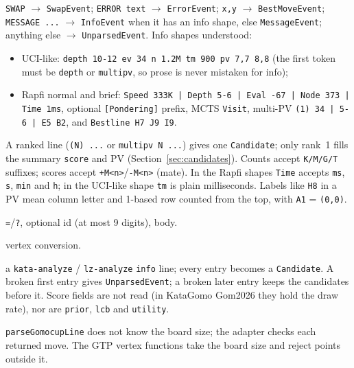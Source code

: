 \documentclass[11pt,a4paper]{article}
\newcommand{\code}[1]{\texttt{#1}}
\begin{document}
\begin{description}[style=nextline]
  \item[\code{parseGomocupLine(line)}] \code{SWAP} $\to$ \code{SwapEvent};
    \code{ERROR text} $\to$ \code{ErrorEvent}; \code{x,y} $\to$ \code{BestMoveEvent};
    \code{MESSAGE ...} $\to$ \code{InfoEvent} when it has an info shape, else \code{MessageEvent};
    anything else $\to$ \code{UnparsedEvent}. Info shapes understood:
    \begin{itemize}
      \item UCI-like: \code{depth 10-12 ev 34 n 1.2M tm 900 pv 7,7 8,8} (the first token must be
            \code{depth} or \code{multipv}, so prose is never mistaken for info);
      \item Rapfi normal and brief: \code{Speed 333K | Depth 5-6 | Eval -67 | Node 373 | Time 1ms},
            optional \code{[Pondering]} prefix, MCTS \code{Visit}, multi-PV \code{(1) 34 | 5-6 | E5 B2},
            and \code{Bestline H7 J9 I9}.
    \end{itemize}
    A ranked line (\code{(N) ...} or \code{multipv N ...}) gives one \code{Candidate}; only
    rank~1 fills the summary \code{score} and PV (Section~\ref{sec:candidates}).
    Counts accept \code{K/M/G/T} suffixes; scores accept \code{+M<n>}/\code{-M<n>} (mate). In
    the Rapfi shapes \code{Time} accepts \code{ms}, \code{s}, \code{min} and \code{h}; in the
    UCI-like shape \code{tm} is plain milliseconds. Labels like \code{H8} in a PV mean column
    letter and 1-based row counted from the top, with \code{A1} = \code{(0,0)}.
  \item[\code{parseGtpResponseHeader(line)}] \code{=}/\code{?}, optional id (at most 9 digits), body.
  \item[\code{parseGtpVertex(text, w, h)} / \code{formatGtpVertex(coord, w, h)}] vertex conversion.
  \item[\code{parseGtpAnalyzeLine(line, w, h)}] a \code{kata-analyze} / \code{lz-analyze}
    \code{info} line; every entry becomes a \code{Candidate}. A broken first entry gives
    \code{UnparsedEvent}; a broken later entry keeps the candidates before it. Score fields are
    not read (in KataGomo Gom2026 they hold the draw rate), nor are \code{prior}, \code{lcb} and
    \code{utility}.
\end{description}

\noindent \code{parseGomocupLine} does not know the board size; the adapter checks each returned
move. The GTP vertex functions take the board size and reject points outside it.
\end{document}
